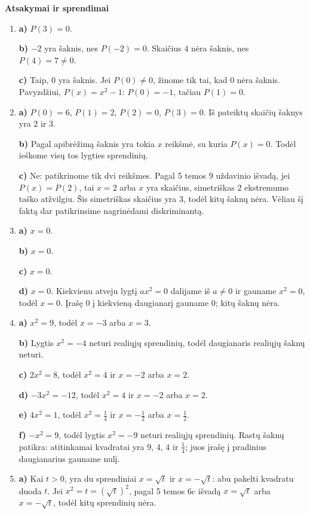 \documentclass[12pt,a4paper]{article}
\begin{document}
\newpage\begin{center}{\Large\bfseries Atsakymai ir sprendimai}\end{center}
\begin{enumerate}
\item \textbf{a)} $P(3)=0$.

\textbf{b)} $-2$ yra šaknis, nes $P(-2)=0$. Skaičius $4$ nėra šaknis, nes $P(4)=7\ne0$.

\textbf{c)} Taip, $0$ yra šaknis. Jei $P(0)\ne0$, žinome tik tai, kad $0$ nėra šaknis. Pavyzdžiui, $P(x)=x^2-1$: $P(0)=-1$, tačiau $P(1)=0$.
\item \textbf{a)} $P(0)=6$, $P(1)=2$, $P(2)=0$, $P(3)=0$. Iš pateiktų skaičių šaknys yra $2$ ir $3$.

\textbf{b)} Pagal apibrėžimą šaknis yra tokia $x$ reikšmė, su kuria $P(x)=0$. Todėl ieškome visų tos lygties sprendinių.

\textbf{c)} Ne: patikrinome tik dvi reikšmes. Pagal 5 temos 9 uždavinio išvadą, jei $P(x)=P(2)$, tai $x=2$ arba $x$ yra skaičius, simetriškas $2$ ekstremumo taško atžvilgiu. Šis simetriškas skaičius yra $3$, todėl kitų šaknų nėra. Vėliau šį faktą dar patikrinsime nagrinėdami diskriminantą.
\item \textbf{a)} $x=0$.

\textbf{b)} $x=0$.

\textbf{c)} $x=0$.

\textbf{d)} $x=0$. Kiekvienu atveju lygtį $ax^2=0$ dalijame iš $a\ne0$ ir gauname $x^2=0$, todėl $x=0$. Įrašę $0$ į kiekvieną daugianarį gauname $0$; kitų šaknų nėra.
\item \textbf{a)} $x^2=9$, todėl $x=-3$ arba $x=3$.

\textbf{b)} Lygtis $x^2=-4$ neturi realiųjų sprendinių, todėl daugianaris realiųjų šaknų neturi.

\textbf{c)} $2x^2=8$, todėl $x^2=4$ ir $x=-2$ arba $x=2$.

\textbf{d)} $-3x^2=-12$, todėl $x^2=4$ ir $x=-2$ arba $x=2$.

\textbf{e)} $4x^2=1$, todėl $x^2=\frac{1}{4}$ ir $x=-\frac{1}{2}$ arba $x=\frac{1}{2}$.

\textbf{f)} $-x^2=9$, todėl lygtis $x^2=-9$ neturi realiųjų sprendinių. Rastų šaknų patikra: atitinkamai kvadratai yra $9$, $4$, $4$ ir $\frac{1}{4}$; juos įrašę į pradinius daugianarius gauname nulį.
\item \textbf{a)} Kai $t>0$, yra du sprendiniai $x=\sqrt t$ ir $x=-\sqrt t$: abu pakelti kvadratu duoda $t$. Jei $x^2=t=(\sqrt t)^2$, pagal 5 temos 6c išvadą $x=\sqrt t$ arba $x=-\sqrt t$, todėl kitų sprendinių nėra.


\end{enumerate}
\end{document}

